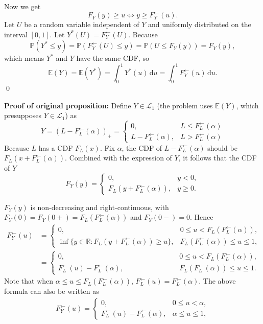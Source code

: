 \documentclass{MFM-hw} %
\newcommand{\real}{\mathbb{R}}
\newcommand{\dd}{\,\mathrm{d}}
\newcommand{\E}{\mathbb{E}}
\renewcommand{\P}{\mathbb{P}}
\begin{document}
Now we get
\[
    F_Y(y) \ge u \Leftrightarrow y \ge F_Y^{\leftarrow}(u).
\]
Let $U$ be a random variable independent of $Y$ and uniformly distributed on the interval $[0,1]$. Let $Y^{*}(U) = F_Y^{\leftarrow}(U)$. Because
\[
    \P(Y^* \le y) = \P(F_Y^{\leftarrow}(U) \le y) = \P(U \le F_Y(y)) = F_Y(y),  
\]
which means $Y^*$ and $Y$ have the same CDF, so
\[
    \E(Y) = \E(Y^*) = \int_0^1 Y^*(u)\dd u = \int_0^1 F_Y^{\leftarrow}(u)\dd u.
\]\qed

\textbf{Proof of original proposition: }Define $Y \in \mathcal{L}_1$ (the problem uses $\E(Y)$, which presupposes $Y \in \mathcal{L}_1$) as
$$
    Y = (L- F_L^{\leftarrow}(\alpha))_{+} = 
    \begin{cases}
        0, & L \le F_L^{\leftarrow}(\alpha) \\
        L - F_L^{\leftarrow}(\alpha), &L >F_L^{\leftarrow}(\alpha)
    \end{cases}
$$
Because $L$ has a CDF $F_L(x)$. Fix $\alpha$, the CDF of $L - F_L^{\leftarrow}(\alpha)$ should be $F_L(x + F_L^{\leftarrow}(\alpha))$. Combined with the expression of $Y$, it follows that the CDF of $Y$
\[
    F_Y(y) = 
    \begin{cases}
        0, & y < 0,\\
        F_L(y + F_L^{\leftarrow}(\alpha)), &y \ge 0.
    \end{cases}
\]

$F_Y(y)$ is non-decreasing and right-continuous, with $F_Y(0) = F_Y(0+) = F_L(F_L^{\leftarrow}(\alpha))$ and $F_Y(0-) = 0$. Hence
\begin{align*}
    F_Y^{\leftarrow}(u) &= 
    \begin{cases}
        0, &0 \le u <  F_L(F_L^{\leftarrow}(\alpha)),\\
        \inf\{y \in \real:F_L(y + F_L^{\leftarrow}(\alpha)) \ge u\}, & F_L(F_L^{\leftarrow}(\alpha)) \le u \le 1,
    \end{cases}\\
    &=
    \begin{cases}
        0, \qquad\qquad\qquad\quad &0 \le u <  F_L(F_L^{\leftarrow}(\alpha)),\\
        F_L^{\leftarrow}(u) - F_L^{\leftarrow}(\alpha), \qquad\qquad\qquad\quad & F_L(F_L^{\leftarrow}(\alpha)) \le u \le 1.
    \end{cases}
\end{align*}
Note that when $\alpha \le u \le F_L(F_L^{\leftarrow}(\alpha))$, $F_L^{\leftarrow}(u) = F_L^{\leftarrow}(\alpha)$. The above formula can also be written as
\begin{align*}
    F_Y^{\leftarrow}(u) = 
    \begin{cases}
        0, &0 \le u <  \alpha,\\
        F_L^{\leftarrow}(u) - F_L^{\leftarrow}(\alpha), & \alpha \le u \le 1,
    \end{cases}\\
\end{align*}
\end{document}
